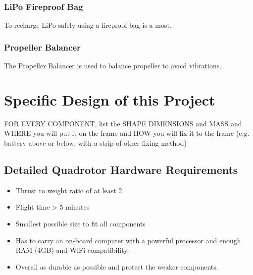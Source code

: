 \subsubsection{LiPo Fireproof Bag}
To recharge LiPo safely using a fireproof bag is a most.

\subsubsection{Propeller Balancer}
The Propeller Balancer is used to balance propeller to avoid vibrations.





\section{Specific Design of this Project}



FOR EVERY COMPONENT, list the SHAPE DIMENSIONS and MASS and WHERE you will put it on the frame and HOW you will fix it to the frame (e.g. battery above or below, with a strip of other fixing method)

\subsection{Detailed Quadrotor Hardware Requirements}
\begin{itemize}
    \item Thrust to weight ratio of at least 2
    \item Flight time > 5 minutes
    \item Smallest possible size to fit all components
    \item Has to carry an on-board computer with a powerful processor and enough RAM (4GB) and WiFi compatibility.
    \item Overall as durable as possible and protect the weaker components.
\end{itemize}


